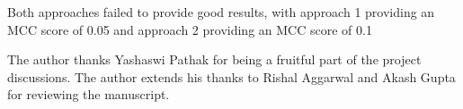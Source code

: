 \documentclass[journal=jacsat,manuscript=article]{achemso}
\begin{document}
Both approaches failed to provide good results, with approach 1 providing an MCC score of 0.05 and approach 2 providing an MCC score of 0.1

\begin{acknowledgement}
    The author thanks Yashaswi Pathak for being a fruitful part of the project discussions. The author extends his thanks to Rishal Aggarwal and Akash Gupta for reviewing the manuscript.

\end{acknowledgement}


\end{document}
